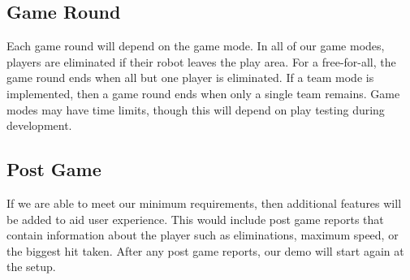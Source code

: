 \documentclass[11pt]{ieeeconf}
\begin{document}
\subsection{Game Round}
Each game round will depend on the game mode. In all of our game modes, players are eliminated if their robot leaves the play area. For a free-for-all, the game round ends when all but one player is eliminated. If a team mode is implemented, then a game round ends when only a single team remains. Game modes may have time limits, though this will depend on play testing during development.

\subsection{Post Game}
If we are able to meet our minimum requirements, then additional features will be added to aid user experience. This would include post game reports that contain information about the player such as eliminations, maximum speed, or the biggest hit taken. After any post game reports, our demo will start again at the setup.




\end{document}
